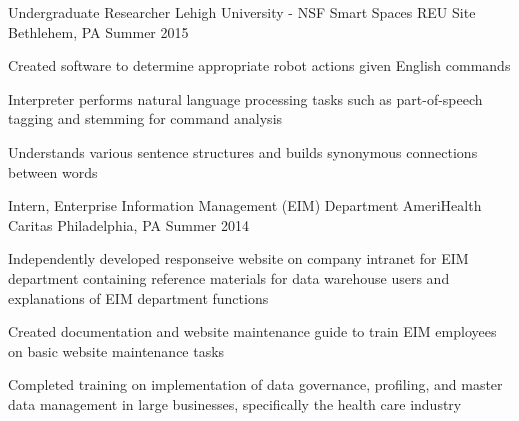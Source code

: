 

\begin{cventries}

  \cventry
    {Undergraduate Researcher} %
    {Lehigh University - NSF Smart Spaces REU Site} %
    {Bethlehem, PA} %
    {Summer 2015} %
    {
      \begin{cvitems} %
        \item {Created software to determine appropriate robot actions given English commands}
        \item {Interpreter performs natural language processing tasks such as part-of-speech tagging and stemming for command analysis}
        \item {Understands various sentence structures and builds synonymous connections between words}
      \end{cvitems}
    }

  \cventry
    {Intern, Enterprise Information Management (EIM) Department} %
    {AmeriHealth Caritas} %
    {Philadelphia, PA} %
    {Summer 2014} %
    {
      \begin{cvitems} %
        \item {Independently developed responseive website on company intranet for EIM department containing reference materials for data warehouse users and explanations of EIM department functions}
        \item {Created documentation and website maintenance guide to train EIM employees on basic website maintenance tasks}
        \item {Completed training on implementation of data governance, profiling, and master data management in large businesses, specifically the health care industry}
      \end{cvitems}
    }

\end{cventries}
